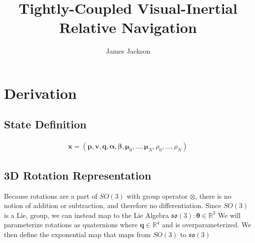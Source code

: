 \documentclass[letterpaper, 10 pt, conference]{ieeeconf}  %
\title{\LARGE \bf  Tightly-Coupled Visual-Inertial Relative Navigation}
\author{James Jackson}%
\begin{document}
\maketitle
\thispagestyle{empty}
\pagestyle{empty}

\section{Derivation}

\subsection{State Definition}

\newcommand{\bx}{\mathbf{x}}
\newcommand{\xdot}{\dot{\mathbf{x}}}
\newcommand{\xhat}{\hat{\mathbf{x}}}
\newcommand{\xtilde}{\tilde{\mathbf{x}}}
\newcommand{\pos}{\mathbf{p}}
\newcommand{\pdot}{\dot{\mathbf{p}}}
\newcommand{\vel}{\mathbf{v}}
\newcommand{\vdot}{\dot{\mathbf{v}}}
\newcommand{\quat}{\mathbf{q}}
\newcommand{\balpha}{\mathbf{\alpha}}
\newcommand{\bbeta}{\mathbf{\beta}}
\newcommand{\qdot}{\dot{\mathbf{q}}}
\newcommand{\badot}{\dot{\mathbf{\alpha}}}
\newcommand{\bbdot}{\dot{\mathbf{\beta}}}
\newcommand{\bmu}{\mathbf{\mu}}
\newcommand{\bmudot}{\dot{\mathbf{\mu}}}
\newcommand{\bomega}{\mathbf{\omega}}
\newcommand{\crs}{_\times}
\newcommand{\bxi}{\mathbf{\xi}}
\newcommand{\bu}{\mathbf{u}}
\newcommand{\bn}{\mathbf{n}}
\newcommand{\bnu}{\mathbf{\nu}}

\newcommand{\acc}{\mathbf{a}}
\newcommand{\grav}{\mathbf{g}}

\newcommand{\bigR}{\mathbb{R}}
\newcommand{\bigS}{S}

\newcommand{\btheta}{\mathbf{\theta}}
\newcommand{\atan}{\textrm{atan}}

\newcommand{\sV}{\mathcal{V}}

\newcommand{\ihat}{\hat{\mathbf{i}}}
\newcommand{\jhat}{\hat{\mathbf{j}}}
\newcommand{\khat}{\hat{\mathbf{k}}}


\begin{equation}
\begin{aligned}
	\bx = (\pos, \vel, \quat, \balpha, \bbeta, \bmu_0,  \dots, \bmu_N, \rho_0, \dots, \rho_N)
\end{aligned}
\end{equation}

\subsection{3D Rotation Representation}
Because rotations are a part of $SO(3)$ with group operator $\otimes$, there is no notion of addition or subtraction, and therefore no differentiation.  Since $SO(3)$ is a Lie, group, we can instead map to the Lie Algebra $\mathfrak{so}(3): \btheta \in \bigR^{3}$  We will parameterize rotations as quaternions where $\quat \in \bigR^4$ and is overparameterized.  We then define the exponential map that maps from $SO(3)$ to $\mathfrak{so}(3)$
\end{document}
